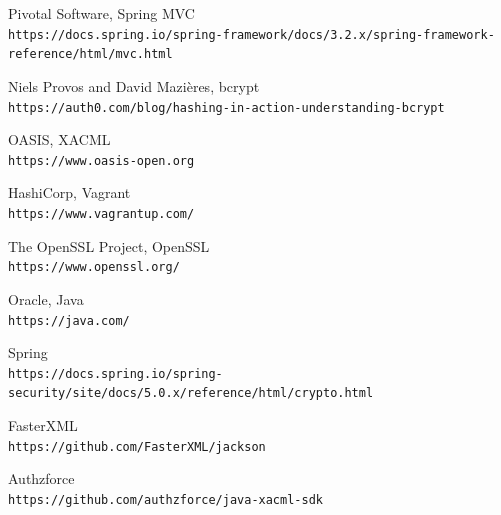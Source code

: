 \begin{thebibliography}{9}
Pivotal Software, Spring MVC
\\\texttt{https://docs.spring.io/spring-framework/docs/3.2.x/spring-framework-reference/html/mvc.html}

Niels Provos and David Mazières, bcrypt
\\\texttt{https://auth0.com/blog/hashing-in-action-understanding-bcrypt}

OASIS, XACML
\\\texttt{https://www.oasis-open.org}

HashiCorp, Vagrant
\\\texttt{https://www.vagrantup.com/}

The OpenSSL Project, OpenSSL
\\\texttt{https://www.openssl.org/}

Oracle, Java
\\\texttt{https://java.com/}

Spring
\\\texttt{https://docs.spring.io/spring-security/site/docs/5.0.x/reference/html/crypto.html}

FasterXML
\\\texttt{https://github.com/FasterXML/jackson}


Authzforce
\\\texttt{https://github.com/authzforce/java-xacml-sdk}



\end{thebibliography}

